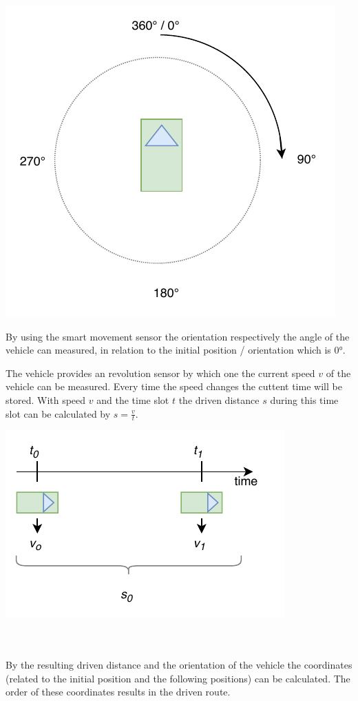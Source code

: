 \begin{minipage}{0.5\textwidth}
\centering
	\includegraphics[scale=0.6]{sources/mapping/orientation.pdf}
\end{minipage}
\begin{minipage}{0.5\textwidth}
By using the smart movement sensor the orientation respectively the angle of the vehicle can measured, in relation to the initial position / orientation which is \ang{0}.
\end{minipage}

\begin{minipage}{0.5\textwidth}
The vehicle provides an revolution sensor by which one the current speed $v$ of the vehicle can be measured. Every time the speed changes the cuttent time will be stored. With speed $v$ and the time slot $t$ the driven distance $s$ during this time slot can be calculated by $s=\frac{v}{t}$.
\end{minipage}
\begin{minipage}{0.5\textwidth}
	\centering
	\includegraphics[scale=0.8]{sources/mapping/distance.pdf}
\end{minipage}
\\
\\
By the resulting driven distance and the orientation of the vehicle the coordinates (related to the initial position and the following positions) can be calculated. The order of these coordinates results in the driven route.

